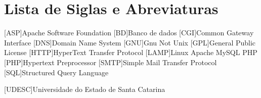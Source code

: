 \chapter*{Lista de Siglas e Abreviaturas}
\begin{acronym}

[ASP]{Apache Software Foundation}
[BD]{Banco de dados}
[CGI]{Common Gateway Interface}
[DNS]{Domain Name System}
[GNU]{Gnu Not Unix}
[GPL]{General Public License}
[HTTP]{HyperText Transfer Protocol}
[LAMP]{Linux Apache MySQL PHP}
[PHP]{Hypertext Preprocessor}
[SMTP]{Simple Mail Transfer Protocol}
[SQL]{Structured Query Language}

[UDESC]{Universidade do Estado de Santa Catarina}
\begin{comment}
\acro{CLI}[CLI]{Command Line Interface}
\acro{CPU}[CPU]{Central Processing Unit}
\acro{DPCF}[DPCF]{Data Plane Control Function}
\acro{IETF}[IETF]{Internet Engineering Task Force}
\acro{IO}[I/O]{Input/Output}
\acro{LSD}[LSD]{Link State Database}
\acro{NFS}[NFS]{Network File System}
\acro{ONF}[ONF]{Open Networking Fundation}
\acro{OSPF}[OSPF]{Open Shortest Path First}
\acro{PRNG}[PRNG]{Pseudo-Random Number Generator}
\acro{QOS}[QOS]{Quality of Service}
\acro{RAM}[RAM]{Random Access Memory}
\acro{SDN}[SDN]{Software Defined Network}
\acro{SNMP}[SNMP]{Simple Network Management Protocol}
\end{comment}

\end{acronym}
